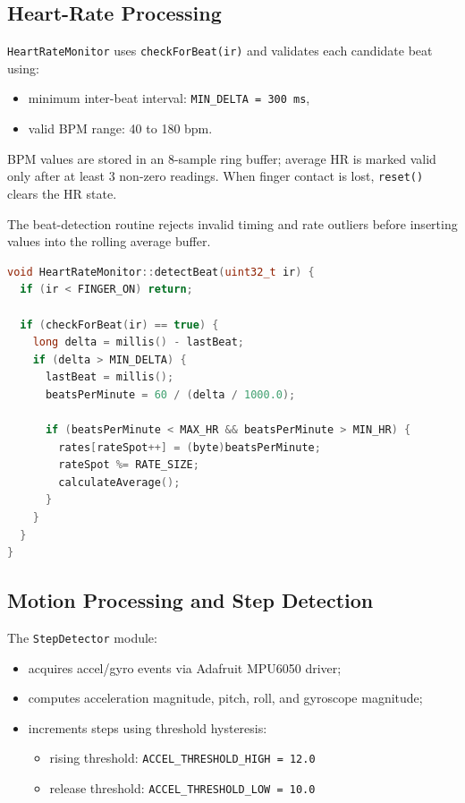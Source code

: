 \documentclass[12pt,a4paper]{report}
\begin{document}
\subsection{Heart-Rate Processing}
\texttt{HeartRateMonitor} uses \texttt{checkForBeat(ir)} and validates each candidate beat using:
\begin{itemize}
  \item minimum inter-beat interval: \texttt{MIN\_DELTA = 300 ms},
  \item valid BPM range: 40 to 180 bpm.
\end{itemize}

BPM values are stored in an 8-sample ring buffer; average HR is marked valid only after at least 3 non-zero readings. When finger contact is lost, \texttt{reset()} clears the HR state.

The beat-detection routine rejects invalid timing and rate outliers before inserting values into the rolling average buffer.
\begin{lstlisting}[style=codestyle, language=C++]
void HeartRateMonitor::detectBeat(uint32_t ir) {
  if (ir < FINGER_ON) return;

  if (checkForBeat(ir) == true) {
    long delta = millis() - lastBeat;
    if (delta > MIN_DELTA) {
      lastBeat = millis();
      beatsPerMinute = 60 / (delta / 1000.0);

      if (beatsPerMinute < MAX_HR && beatsPerMinute > MIN_HR) {
        rates[rateSpot++] = (byte)beatsPerMinute;
        rateSpot %= RATE_SIZE;
        calculateAverage();
      }
    }
  }
}
\end{lstlisting}

\subsection{Motion Processing and Step Detection}
The \texttt{StepDetector} module:
\begin{itemize}
  \item acquires accel/gyro events via Adafruit MPU6050 driver;
  \item computes acceleration magnitude, pitch, roll, and gyroscope magnitude;
  \item increments steps using threshold hysteresis:
  \begin{itemize}
    \item rising threshold: \texttt{ACCEL\_THRESHOLD\_HIGH = 12.0}
    \item release threshold: \texttt{ACCEL\_THRESHOLD\_LOW = 10.0}
  \end{itemize}
\end{itemize}
\end{document}
